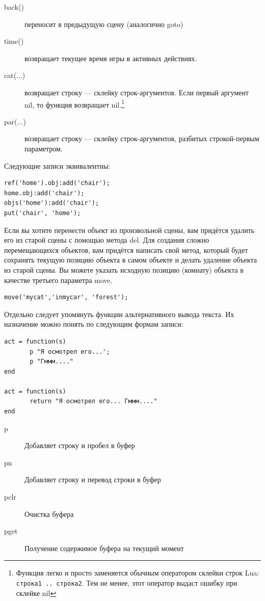 \documentclass[a4paper,12pt]{article}
\begin{document}
\begin{description}
\item[back()]  переносит в предыдущую сцену (аналогично goto)
\item[time()]  возвращает текущее время игры в активных действиях.
\item[cat(...)]  возвращает строку --- склейку строк-аргументов. Если первый аргумент nil, то функция возвращает nil.\footnote{Функция легко и просто заменяется обычным оператором склейки строк Lua: \texttt{строка1 .. строка2}. Тем не менее, этот оператор выдаст ошибку при склейке nil}
\item[par(...)]  возвращает строку --- склейку строк-аргументов, разбитых строкой-первым параметром.
\end{description}

Следующие записи эквивалентны:

\begin{verbatim}
ref('home').obj:add('chair');
home.obj:add('chair');
objs('home'):add('chair');
put('chair', 'home');
\end{verbatim}

Если вы хотите перенести объект из произвольной сцены, вам придётся удалить его из старой сцены с помощью метода del. Для создания сложно перемещающихся объектов, вам придётся написать свой метод, который будет сохранять текущую позицию объекта в самом объекте и делать удаление объекта из старой сцены. Вы можете указать исходную позицию (комнату) объекта в качестве третьего параметра move.

\begin{verbatim}
move('mycat','inmycar', 'forest');
\end{verbatim}

Отдельно следует упомянуть функции альтернативного вывода текста. Их назначение можно понять по следующим формам записи:

\begin{verbatim}
act = function(s)
       p "Я осмотрел его...';
       p "Гммм...."
end

act = function(s)
       return "Я осмотрел его... Гммм...."
end
\end{verbatim}

\begin{description}
\item[p]  Добавляет строку и пробел в буфер
\item[pn]  Добавляет строку и перевод строки в буфер
\item[pclr]  Очистка буфера
\item[pget]  Получение содержимое буфера на текущий момент
\end{description}
\end{document}

